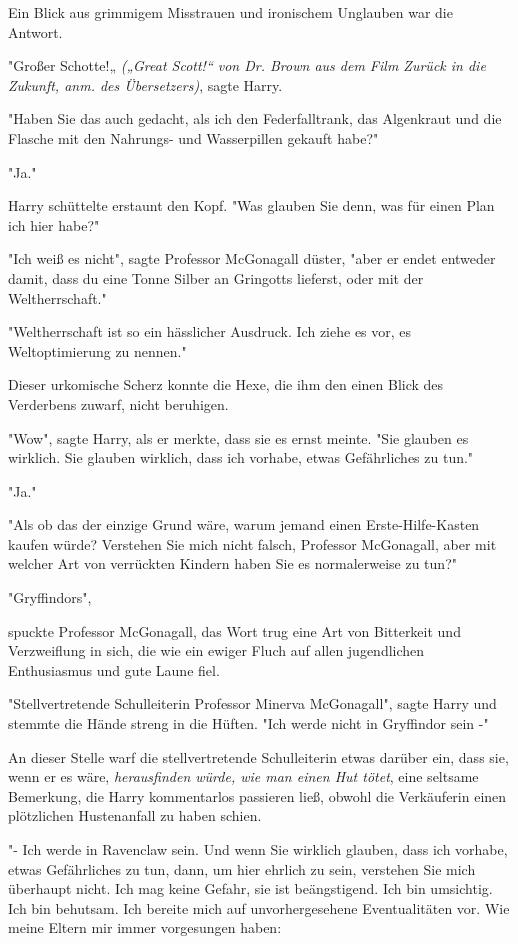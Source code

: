 {Ein Blick aus grimmigem Misstrauen und ironischem Unglauben war die Antwort.

"Großer Schotte!„ \emph{(„Great Scott!“ von Dr. Brown aus dem Film Zurück in die Zukunft, anm. des Übersetzers)}, sagte Harry.

"Haben Sie das auch gedacht, als ich den Federfalltrank, das Algenkraut und die Flasche mit den Nahrungs- und Wasserpillen gekauft habe?"

"Ja."

Harry schüttelte erstaunt den Kopf. "Was glauben Sie denn, was für einen Plan ich hier habe?"

"Ich weiß es nicht", sagte Professor McGonagall düster, "aber er endet entweder damit, dass du eine Tonne Silber an Gringotts lieferst, oder mit der Weltherrschaft."

"Weltherrschaft ist so ein hässlicher Ausdruck. Ich ziehe es vor, es Weltoptimierung zu nennen."

Dieser urkomische Scherz konnte die Hexe, die ihm den einen Blick des Verderbens zuwarf, nicht beruhigen.

"Wow", sagte Harry, als er merkte, dass sie es ernst meinte. "Sie glauben es wirklich. Sie glauben wirklich, dass ich vorhabe, etwas Gefährliches zu tun."

"Ja."

"Als ob das der einzige Grund wäre, warum jemand einen Erste-Hilfe-Kasten kaufen würde? Verstehen Sie mich nicht falsch, Professor McGonagall, aber mit welcher Art von verrückten Kindern haben Sie es normalerweise zu tun?"

"Gryffindors",

spuckte Professor McGonagall, das Wort trug eine Art von Bitterkeit und Verzweiflung in sich, die wie ein ewiger Fluch auf allen jugendlichen Enthusiasmus und gute Laune fiel.

"Stellvertretende Schulleiterin Professor Minerva McGonagall", sagte Harry und stemmte die Hände streng in die Hüften. "Ich werde nicht in Gryffindor sein -"

An dieser Stelle warf die stellvertretende Schulleiterin etwas darüber ein, dass sie, wenn er es wäre, \emph{herausfinden würde, wie man einen Hut tötet}, eine seltsame Bemerkung, die Harry kommentarlos passieren ließ, obwohl die Verkäuferin einen plötzlichen Hustenanfall zu haben schien.

"- Ich werde in Ravenclaw sein. Und wenn Sie wirklich glauben, dass ich vorhabe, etwas Gefährliches zu tun, dann, um hier ehrlich zu sein, verstehen Sie mich überhaupt nicht. Ich mag keine Gefahr, sie ist beängstigend. Ich bin umsichtig. Ich bin behutsam. Ich bereite mich auf unvorhergesehene Eventualitäten vor. Wie meine Eltern mir immer vorgesungen haben:

}
